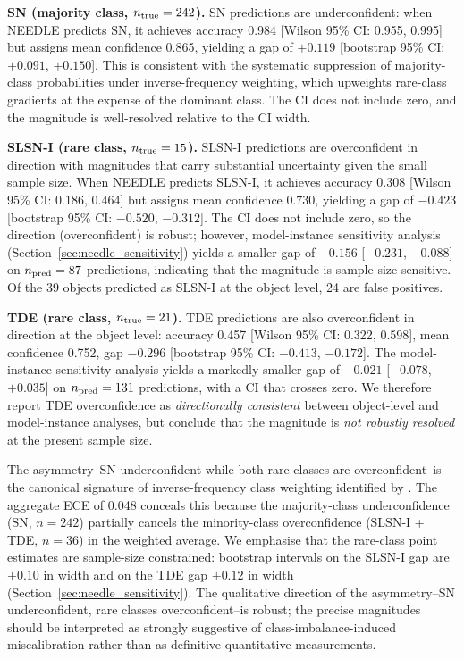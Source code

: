 \documentclass[a4paper,fleqn,usenatbib]{mnras}
\begin{document}
\textbf{SN (majority class, $n_{\rm true} = 242$).} SN predictions are
underconfident: when NEEDLE predicts SN, it achieves accuracy 0.984
[Wilson 95\% CI: 0.955, 0.995] but assigns mean confidence 0.865,
yielding a gap of $+0.119$ [bootstrap 95\% CI: $+0.091$, $+0.150$].
This is consistent with the systematic suppression of majority-class
probabilities under inverse-frequency weighting, which upweights
rare-class gradients at the expense of the dominant class. The CI does
not include zero, and the magnitude is well-resolved relative to the
CI width.

\textbf{SLSN-I (rare class, $n_{\rm true} = 15$).} SLSN-I predictions
are overconfident in direction with magnitudes that carry substantial
uncertainty given the small sample size. When NEEDLE predicts SLSN-I,
it achieves accuracy 0.308 [Wilson 95\% CI: 0.186, 0.464] but assigns
mean confidence 0.730, yielding a gap of $-0.423$ [bootstrap 95\% CI:
$-0.520$, $-0.312$]. The CI does not include zero, so the direction
(overconfident) is robust; however, model-instance sensitivity analysis
(Section~\ref{sec:needle_sensitivity}) yields a smaller gap of $-0.156$
[$-0.231$, $-0.088$] on $n_{\rm pred} = 87$ predictions, indicating
that the magnitude is sample-size sensitive. Of the 39 objects predicted
as SLSN-I at the object level, 24 are false positives.

\textbf{TDE (rare class, $n_{\rm true} = 21$).} TDE predictions are
also overconfident in direction at the object level: accuracy 0.457
[Wilson 95\% CI: 0.322, 0.598], mean confidence 0.752, gap $-0.296$
[bootstrap 95\% CI: $-0.413$, $-0.172$]. The model-instance sensitivity
analysis yields a markedly smaller gap of $-0.021$ [$-0.078$, $+0.035$]
on $n_{\rm pred} = 131$ predictions, with a CI that crosses zero. We
therefore report TDE overconfidence as \textit{directionally consistent}
between object-level and model-instance analyses, but conclude that
the magnitude is \textit{not robustly resolved} at the present
sample size.

The asymmetry--SN underconfident while both rare classes are overconfident--is the canonical signature of inverse-frequency class weighting identified by \citet{vandengoorbergh2022}. The aggregate ECE of 0.048 conceals this because the majority-class underconfidence (SN, $n = 242$) partially cancels the minority-class overconfidence (SLSN-I + TDE, $n = 36$) in the weighted average. We emphasise that the rare-class point estimates are sample-size constrained: bootstrap intervals on the SLSN-I gap are $\pm 0.10$ in width and on the TDE gap $\pm 0.12$ in width (Section~\ref{sec:needle_sensitivity}). The qualitative direction of the asymmetry--SN underconfident, rare classes overconfident--is robust; the precise magnitudes should be interpreted as strongly suggestive of class-imbalance-induced miscalibration rather than as definitive quantitative measurements.
\end{document}
